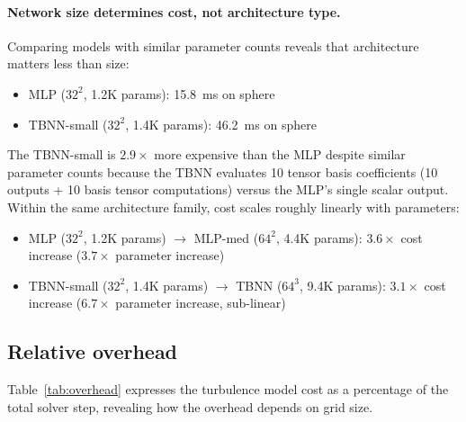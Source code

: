 \paragraph{Network size determines cost, not architecture type.}
Comparing models with similar parameter counts reveals that architecture matters less than size:
\begin{itemize}
    \item MLP ($32^2$, 1.2K params): 15.8~ms on sphere
    \item TBNN-small ($32^2$, 1.4K params): 46.2~ms on sphere
\end{itemize}
The TBNN-small is $2.9\times$ more expensive than the MLP despite similar parameter counts because the TBNN evaluates 10 tensor basis coefficients (10 outputs + 10 basis tensor computations) versus the MLP's single scalar output.
Within the same architecture family, cost scales roughly linearly with parameters:
\begin{itemize}
    \item MLP ($32^2$, 1.2K params) $\to$ MLP-med ($64^2$, 4.4K params): $3.6\times$ cost increase ($3.7\times$ parameter increase)
    \item TBNN-small ($32^2$, 1.4K params) $\to$ TBNN ($64^3$, 9.4K params): $3.1\times$ cost increase ($6.7\times$ parameter increase, sub-linear)
\end{itemize}

\subsection{Relative overhead}
\label{sec:cost:overhead}

Table~\ref{tab:overhead} expresses the turbulence model cost as a percentage of the total solver step, revealing how the overhead depends on grid size.

